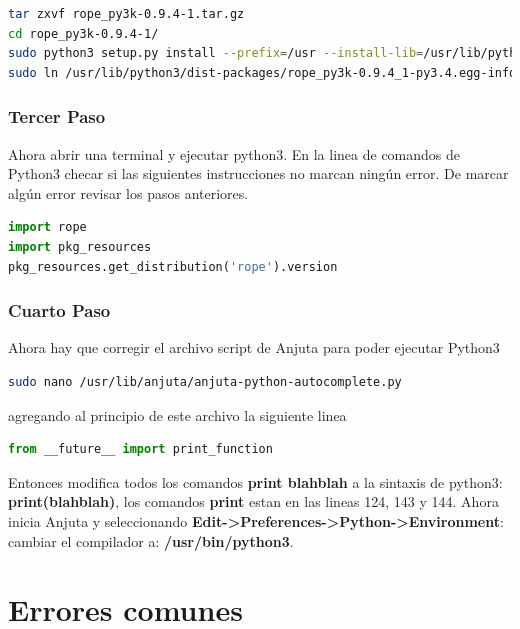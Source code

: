 \documentclass[12pt,twoside]{book}
\begin{document}
\begin{lstlisting}[language=bash]
tar zxvf rope_py3k-0.9.4-1.tar.gz
cd rope_py3k-0.9.4-1/
sudo python3 setup.py install --prefix=/usr --install-lib=/usr/lib/python3/dist-packages
sudo ln /usr/lib/python3/dist-packages/rope_py3k-0.9.4_1-py3.4.egg-info /usr/lib/python3/dist-packages/rope-0.9.4_1-py3.4.egg-info
\end{lstlisting}

\subsubsection{Tercer Paso}

Ahora abrir una terminal y ejecutar python3. En la linea de comandos de Python3 checar si las siguientes instrucciones no marcan ningún error. De marcar algún error revisar los pasos anteriores.

\begin{lstlisting}[language=Python]
import rope
import pkg_resources
pkg_resources.get_distribution('rope').version 
\end{lstlisting}

\subsubsection{Cuarto Paso}

Ahora hay que corregir el archivo script de Anjuta para poder ejecutar Python3 

\begin{lstlisting}[language=bash]
sudo nano /usr/lib/anjuta/anjuta-python-autocomplete.py
\end{lstlisting}

agregando al principio de este archivo la siguiente linea 

\begin{lstlisting}[language=Python]
from __future__ import print_function
\end{lstlisting}


Entonces modifica todos los comandos  \textbf{print blahblah} a la sintaxis de python3: \textbf{print(blahblah)}, los comandos \textbf{print} estan en las lineas 124, 143 y 144.
Ahora inicia Anjuta y seleccionando \textbf{Edit->Preferences->Python->Environment}: cambiar el compilador a: \textbf{/usr/bin/python3}.   

\section*{Errores comunes}
\end{document}
